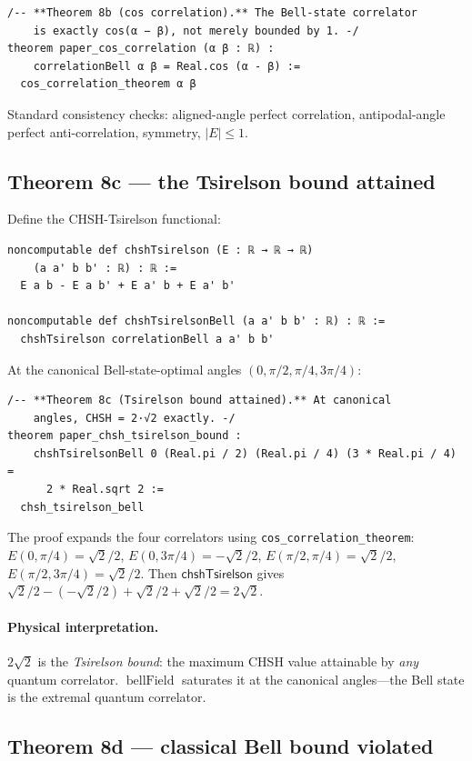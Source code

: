 \documentclass[11pt,a4paper,twoside]{article}
\theoremstyle{definition}
\newcommand{\code}[1]{\texttt{#1}}
\newcommand{\BellField}{\operatorname{bellField}}
\begin{document}
\begin{lstlisting}
/-- **Theorem 8b (cos correlation).** The Bell-state correlator
    is exactly cos(α − β), not merely bounded by 1. -/
theorem paper_cos_correlation (α β : ℝ) :
    correlationBell α β = Real.cos (α - β) :=
  cos_correlation_theorem α β
\end{lstlisting}

Standard consistency checks: aligned-angle perfect correlation,
antipodal-angle perfect anti-correlation, symmetry, $|E|\le 1$.

\subsection{Theorem 8c --- the Tsirelson bound
attained}\label{sec:T8c}

Define the CHSH-Tsirelson functional:
\begin{lstlisting}
noncomputable def chshTsirelson (E : ℝ → ℝ → ℝ)
    (a a' b b' : ℝ) : ℝ :=
  E a b - E a b' + E a' b + E a' b'

noncomputable def chshTsirelsonBell (a a' b b' : ℝ) : ℝ :=
  chshTsirelson correlationBell a a' b b'
\end{lstlisting}

At the canonical Bell-state-optimal angles $(0,\pi/2,\pi/4,3\pi/4)$:
\begin{lstlisting}
/-- **Theorem 8c (Tsirelson bound attained).** At canonical
    angles, CHSH = 2·√2 exactly. -/
theorem paper_chsh_tsirelson_bound :
    chshTsirelsonBell 0 (Real.pi / 2) (Real.pi / 4) (3 * Real.pi / 4) =
      2 * Real.sqrt 2 :=
  chsh_tsirelson_bell
\end{lstlisting}

The proof expands the four correlators using
\code{cos\_correlation\_theorem}:
$E(0,\pi/4)=\sqrt{2}/2$, $E(0,3\pi/4)=-\sqrt{2}/2$,
$E(\pi/2,\pi/4)=\sqrt{2}/2$, $E(\pi/2,3\pi/4)=\sqrt{2}/2$. Then
$\mathsf{chshTsirelson}$ gives
$\sqrt{2}/2-(-\sqrt{2}/2)+\sqrt{2}/2+\sqrt{2}/2=2\sqrt{2}$.

\paragraph{Physical interpretation.}
$2\sqrt{2}$ is the \emph{Tsirelson bound}: the maximum CHSH value
attainable by \emph{any} quantum correlator. $\BellField$ saturates
it at the canonical angles---the Bell state is the extremal quantum
correlator.

\subsection{Theorem 8d --- classical Bell bound
violated}\label{sec:T8d}
\end{document}
